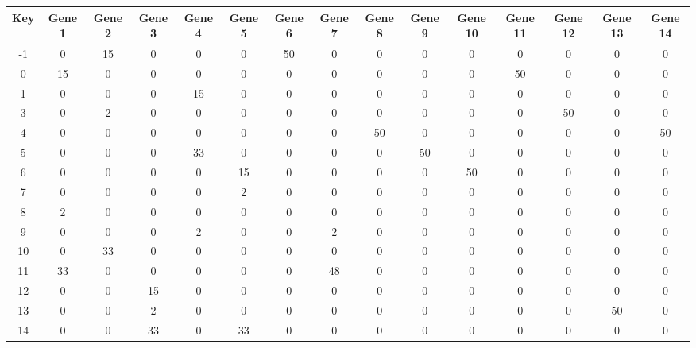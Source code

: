 \begin{tabular}{|c|c|c|c|c|c|c|c|c|c|c|c|c|c|c|}
\hline
Key & Gene 1 & Gene 2 & Gene 3 & Gene 4 & Gene 5 & Gene 6 & Gene 7 & Gene 8 & Gene 9 & Gene 10 & Gene 11 & Gene 12 & Gene 13 & Gene 14 \\
\hline
-1 & 0 & 15 & 0 & 0 & 0 & 50 & 0 & 0 & 0 & 0 & 0 & 0 & 0 & 0 \\
0 & 15 & 0 & 0 & 0 & 0 & 0 & 0 & 0 & 0 & 0 & 50 & 0 & 0 & 0 \\
1 & 0 & 0 & 0 & 15 & 0 & 0 & 0 & 0 & 0 & 0 & 0 & 0 & 0 & 0 \\
3 & 0 & 2 & 0 & 0 & 0 & 0 & 0 & 0 & 0 & 0 & 0 & 50 & 0 & 0 \\
4 & 0 & 0 & 0 & 0 & 0 & 0 & 0 & 50 & 0 & 0 & 0 & 0 & 0 & 50 \\
5 & 0 & 0 & 0 & 33 & 0 & 0 & 0 & 0 & 50 & 0 & 0 & 0 & 0 & 0 \\
6 & 0 & 0 & 0 & 0 & 15 & 0 & 0 & 0 & 0 & 50 & 0 & 0 & 0 & 0 \\
7 & 0 & 0 & 0 & 0 & 2 & 0 & 0 & 0 & 0 & 0 & 0 & 0 & 0 & 0 \\
8 & 2 & 0 & 0 & 0 & 0 & 0 & 0 & 0 & 0 & 0 & 0 & 0 & 0 & 0 \\
9 & 0 & 0 & 0 & 2 & 0 & 0 & 2 & 0 & 0 & 0 & 0 & 0 & 0 & 0 \\
10 & 0 & 33 & 0 & 0 & 0 & 0 & 0 & 0 & 0 & 0 & 0 & 0 & 0 & 0 \\
11 & 33 & 0 & 0 & 0 & 0 & 0 & 48 & 0 & 0 & 0 & 0 & 0 & 0 & 0 \\
12 & 0 & 0 & 15 & 0 & 0 & 0 & 0 & 0 & 0 & 0 & 0 & 0 & 0 & 0 \\
13 & 0 & 0 & 2 & 0 & 0 & 0 & 0 & 0 & 0 & 0 & 0 & 0 & 50 & 0 \\
14 & 0 & 0 & 33 & 0 & 33 & 0 & 0 & 0 & 0 & 0 & 0 & 0 & 0 & 0 \\
\hline
\end{tabular}